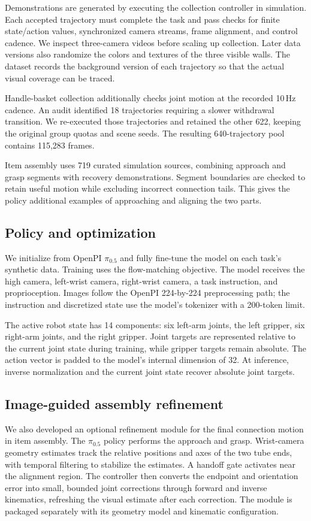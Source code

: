\documentclass{article}
\begin{document}
Demonstrations are generated by executing the collection controller in
simulation. Each accepted trajectory must complete the task and pass
checks for finite state/action values, synchronized camera streams,
frame alignment, and control cadence. We inspect three-camera videos
before scaling up collection. Later data versions also randomize the
colors and textures of the three visible walls. The dataset records
the background version of each trajectory so that the actual visual
coverage can be traced.

Handle-basket collection additionally checks joint motion at the recorded
10\,Hz cadence. An audit identified 18 trajectories requiring a slower
withdrawal transition. We re-executed those trajectories and retained
the other 622, keeping the original group quotas and scene seeds.
The resulting 640-trajectory pool contains 115,283 frames.

Item assembly uses 719 curated simulation sources, combining approach
and grasp segments with recovery demonstrations. Segment boundaries
are checked to retain useful motion while excluding incorrect connection
tails. This gives the policy additional examples of approaching and
aligning the two parts.

\subsection{Policy and optimization}
We initialize from OpenPI $\pi_{0.5}$ and fully fine-tune the model on
each task's synthetic data. Training uses the flow-matching objective.
The model receives the high camera, left-wrist camera, right-wrist
camera, a task instruction, and proprioception. Images follow the
OpenPI 224-by-224 preprocessing path; the instruction and discretized
state use the model's tokenizer with a 200-token limit.

The active robot state has 14 components: six left-arm joints, the left
gripper, six right-arm joints, and the right gripper. Joint targets are
represented relative to the current joint state during training, while
gripper targets remain absolute. The action vector is padded to the
model's internal dimension of 32. At inference, inverse normalization
and the current joint state recover absolute joint targets.

\subsection{Image-guided assembly refinement}
We also developed an optional refinement module for the final connection
motion in item assembly. The $\pi_{0.5}$ policy performs the approach and
grasp. Wrist-camera geometry estimates track the relative positions and
axes of the two tube ends, with temporal filtering to stabilize the
estimates. A handoff gate activates near the alignment region. The
controller then converts the endpoint and orientation error into small,
bounded joint corrections through forward and inverse kinematics,
refreshing the visual estimate after each correction. The module is
packaged separately with its geometry model and kinematic configuration.
\end{document}
